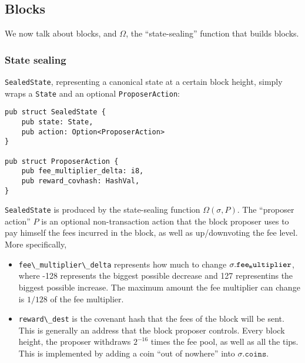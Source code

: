 \documentclass[
]{article}
\newcommand{\passthrough}[1]{#1}
\providecommand{\tightlist}{%
  \setlength{\itemsep}{0pt}\setlength{\parskip}{0pt}}
\begin{document}
\hypertarget{blocks}{%
  \subsection{Blocks}\label{blocks}}

We now talk about blocks, and \(\Omega\), the ``state-sealing'' function
that builds blocks.

\hypertarget{state-sealing}{%
  \subsubsection{State sealing}\label{state-sealing}}

\passthrough{\lstinline!SealedState!}, representing a canonical state at
a certain block height, simply wraps a \passthrough{\lstinline!State!}
and an optional \passthrough{\lstinline!ProposerAction!}:

\begin{lstlisting}
pub struct SealedState {
    pub state: State,
    pub action: Option<ProposerAction>
}

pub struct ProposerAction {
    pub fee_multiplier_delta: i8,
    pub reward_covhash: HashVal,
}
\end{lstlisting}

\passthrough{\lstinline!SealedState!} is produced by the state-sealing
function \(\Omega(\sigma, P)\). The ``proposer action'' \(P\) is an
optional non-transaction action that the block proposer uses to pay
himself the fees incurred in the block, as well as up/downvoting the fee
level. More specifically,

\begin{itemize}
  \tightlist
  \item
        \passthrough{\lstinline!fee\_multiplier\_delta!} represents how much
        to change \(\sigma.\mathtt{fee\\_multiplier}\), where -128 represents
        the biggest possible decrease and 127 representins the biggest
        possible increase. The maximum amount the fee multiplier can change is
        \(1/128\) of the fee multiplier.
  \item
        \passthrough{\lstinline!reward\_dest!} is the covenant hash that the
        fees of the block will be sent. This is generally an address that the
        block proposer controls. Every block height, the proposer withdraws
        \(2^{-16}\) times the fee pool, as well as all the tips. This is
        implemented by adding a coin ``out of nowhere'' into
        \(\sigma.\mathtt{coins}\).
\end{itemize}
\end{document}
